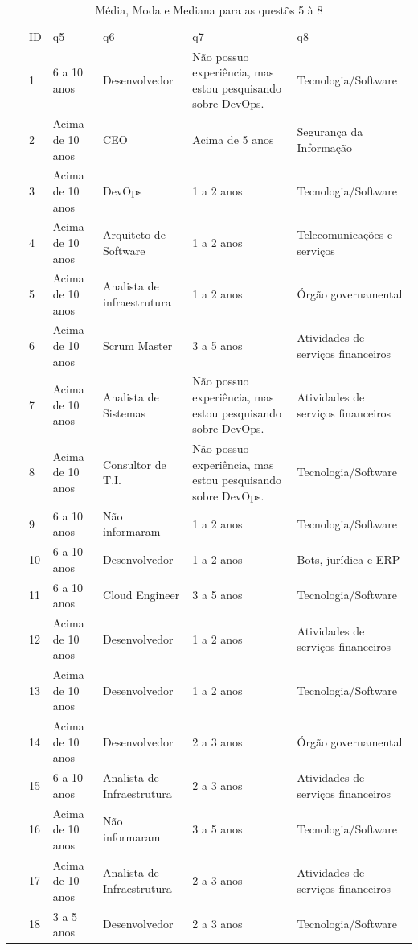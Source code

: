 \documentclass[twoside,english,brazilian]{UNISINOSartigo}
\begin{document}
\begin{table}[h]
\footnotesize
    \caption{Média, Moda e Mediana para as questõs 5 à 8}
    \begin{tabularx}{\textwidth}{llll>{\raggedright}Xl}
    \hline
~ & ID & q5 & q6 & q7 & q8 \\
~ & 1 & 6 a 10 anos & Desenvolvedor & Não possuo experiência, mas estou pesquisando sobre DevOps. & Tecnologia/Software \\
~ & 2 & Acima de 10 anos & CEO & Acima de 5 anos & Segurança da Informação \\
~ & 3 & Acima de 10 anos & DevOps & 1 a 2 anos & Tecnologia/Software \\
~ & 4 & Acima de 10 anos & Arquiteto de Software & 1 a 2 anos & Telecomunicações e serviços \\
~ & 5 & Acima de 10 anos & Analista de infraestrutura & 1 a 2 anos & Órgão governamental \\
~ & 6 & Acima de 10 anos & Scrum Master & 3 a 5 anos & Atividades de serviços financeiros \\
~ & 7 & Acima de 10 anos & Analista de Sistemas & Não possuo experiência, mas estou pesquisando sobre DevOps. & Atividades de serviços financeiros \\
~ & 8 & Acima de 10 anos & Consultor de T.I. & Não possuo experiência, mas estou pesquisando sobre DevOps. & Tecnologia/Software \\
~ & 9 & 6 a 10 anos & Não informaram & 1 a 2 anos & Tecnologia/Software \\
~ & 10 & 6 a 10 anos & Desenvolvedor & 1 a 2 anos & Bots, jurídica e ERP \\
~ & 11 & 6 a 10 anos & Cloud Engineer & 3 a 5 anos & Tecnologia/Software \\
~ & 12 & Acima de 10 anos & Desenvolvedor & 1 a 2 anos & Atividades de serviços financeiros \\
~ & 13 & Acima de 10 anos & Desenvolvedor & 1 a 2 anos & Tecnologia/Software \\
~ & 14 & Acima de 10 anos & Desenvolvedor & 2 a 3 anos & Órgão governamental \\
~ & 15 & 6 a 10 anos & Analista de Infraestrutura & 2 a 3 anos & Atividades de serviços financeiros \\
~ & 16 & Acima de 10 anos & Não informaram & 3 a 5 anos & Tecnologia/Software \\
~ & 17 & Acima de 10 anos & Analista de Infraestrutura & 2 a 3 anos & Atividades de serviços financeiros \\
~ & 18 & 3 a 5 anos & Desenvolvedor & 2 a 3 anos & Tecnologia/Software \\

\end{tabularx}
\end{table}
\end{document}
